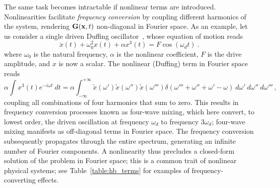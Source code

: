 The same task becomes intractable if nonlinear terms are introduced. Nonlinearities facilitate \textit{frequency conversion} by coupling different harmonics of the system, rendering $\vb{G}(\vb{x},t)$ non-diagonal in Fourier space. As an example, let us consider a single driven Duffing oscillator~\cite{Lifshitz_2008}, whose equation of motion reads
%
\begin{equation} \label{eq:duff_basic}
\ddot{x}(t) + \omega_0^2 x(t) + \alpha x^3(t) = F \cos(\omega_d t) \:.
\end{equation}
%
where $\omega_0$ is the natural frequency, $\alpha$ is the nonlinear coefficient, $F$ is the drive amplitude, and $x$ is now a scalar.
The nonlinear (Duffing) term in Fourier space reads
%
\begin{equation} \label{eq:duffingFT}
\alpha \int x^3(t) e^{-i\omega t} \: dt = \alpha \int_{-\infty}^{+\infty} \tilde{x}(\omega')\tilde{x}(\omega'')\tilde{x}(\omega''') \delta(\omega'''+\omega''+\omega'-\omega) \: d\omega' \: d\omega'' \: d\omega''' \,,
\end{equation}
%
coupling all combinations of four harmonics that sum to zero. This results in frequency conversion processes known as four-wave mixing, which here convert, to lowest order, the driven oscillation at frequency $\omega_d$ to frequency $3\omega_d$; four-wave mixing manifests as off-diagonal terms in Fourier space. The frequency conversion subsequently propagates through the entire spectrum, generating an infinite number of Fourier components. A nonlinearity thus precludes a closed-form solution of the problem in Fourier space; this is a common trait of nonlinear physical systems; see Table~\ref{table:hb_terms} for examples of frequency-converting effects.


